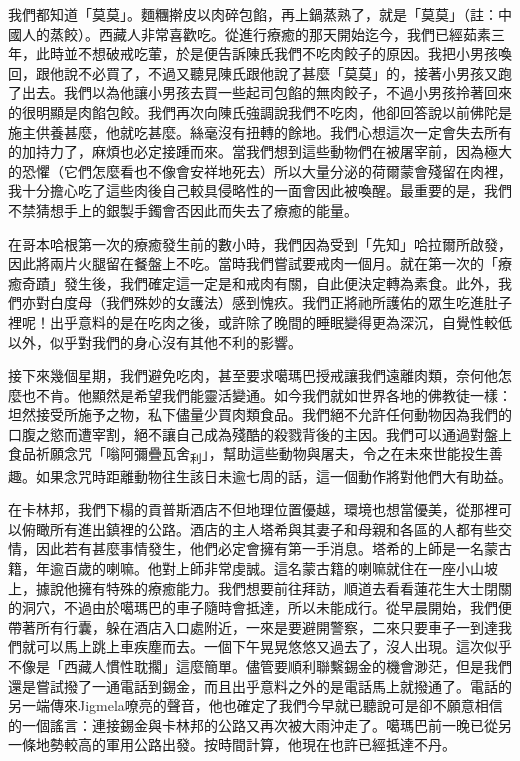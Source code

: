 我們都知道「莫莫」。麵糰擀皮以肉碎包餡，再上鍋蒸熟了，就是「莫莫」（註：中國人的蒸餃）。西藏人非常喜歡吃。從進行療癒的那天開始迄今，我們已經茹素三年，此時並不想破戒吃葷，於是便告訴陳氏我們不吃肉餃子的原因。我把小男孩喚回，跟他說不必買了，不過又聽見陳氏跟他說了甚麼「莫莫」的，接著小男孩又跑了出去。我們以為他讓小男孩去買一些起司包餡的無肉餃子，不過小男孩拎著回來的很明顯是肉餡包餃。我們再次向陳氏強調說我們不吃肉，他卻回答說以前佛陀是施主供養甚麼，他就吃甚麼。絲毫沒有扭轉的餘地。我們心想這次一定會失去所有的加持力了，麻煩也必定接踵而來。當我們想到這些動物們在被屠宰前，因為極大的恐懼（它們怎麼看也不像會安祥地死去）所以大量分泌的荷爾蒙會殘留在肉裡，我十分擔心吃了這些肉後自己較具侵略性的一面會因此被喚醒。最重要的是，我們不禁猜想手上的銀製手鐲會否因此而失去了療癒的能量。

在哥本哈根第一次的療癒發生前的數小時，我們因為受到「先知」哈拉爾所啟發，因此將兩片火腿留在餐盤上不吃。當時我們嘗試要戒肉一個月。就在第一次的「療癒奇蹟」發生後，我們確定這一定是和戒肉有關，自此便決定轉為素食。此外，我們亦對白度母（我們殊妙的女護法）感到愧疚。我們正將祂所護佑的眾生吃進肚子裡呢！出乎意料的是在吃肉之後，或許除了晚間的睡眠變得更為深沉，自覺性較低以外，似乎對我們的身心沒有其他不利的影響。

接下來幾個星期，我們避免吃肉，甚至要求噶瑪巴授戒讓我們遠離肉類，奈何他怎麼也不肯。他顯然是希望我們能靈活變通。如今我們就如世界各地的佛教徒一樣：坦然接受所施予之物，私下儘量少買肉類食品。我們絕不允許任何動物因為我們的口腹之慾而遭宰割，絕不讓自己成為殘酷的殺戮背後的主因。我們可以通過對盤上食品祈願念咒「嗡阿彌疊瓦舍\textsubscript{利}」，幫助這些動物與屠夫，令之在未來世能投生善趣。如果念咒時距離動物往生該日未逾七周的話，這一個動作將對他們大有助益。

在卡林邦，我們下榻的貢普斯酒店不但地理位置優越，環境也想當優美，從那裡可以俯瞰所有進出鎮裡的公路。酒店的主人塔希與其妻子和母親和各區的人都有些交情，因此若有甚麼事情發生，他們必定會擁有第一手消息。塔希的上師是一名蒙古籍，年逾百歲的喇嘛。他對上師非常虔誠。這名蒙古籍的喇嘛就住在一座小山坡上，據說他擁有特殊的療癒能力。我們想要前往拜訪，順道去看看蓮花生大士閉關的洞穴，不過由於噶瑪巴的車子隨時會抵達，所以未能成行。從早晨開始，我們便帶著所有行囊，躲在酒店入口處附近，一來是要避開警察，二來只要車子一到達我們就可以馬上跳上車疾塵而去。一個下午晃晃悠悠又過去了，沒人出現。這次似乎不像是「西藏人慣性耽擱」這麼簡單。儘管要順利聯繫錫金的機會渺茫，但是我們還是嘗試撥了一通電話到錫金，而且出乎意料之外的是電話馬上就撥通了。電話的另一端傳來Jigmela嘹亮的聲音，他也確定了我們今早就已聽說可是卻不願意相信的一個謠言：連接錫金與卡林邦的公路又再次被大雨沖走了。噶瑪巴前一晚已從另一條地勢較高的軍用公路出發。按時間計算，他現在也許已經抵達不丹。

